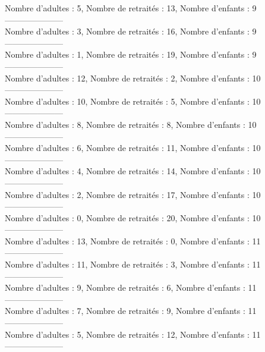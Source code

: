 \documentclass[10pt,a4paper]{article}
\begin{document}
Nombre d'adultes : 5, Nombre de retraités : 13, Nombre d'enfants : 9\\
---------------------\\
Nombre d'adultes : 3, Nombre de retraités : 16, Nombre d'enfants : 9\\
---------------------\\
Nombre d'adultes : 1, Nombre de retraités : 19, Nombre d'enfants : 9\\
---------------------\\
Nombre d'adultes : 12, Nombre de retraités : 2, Nombre d'enfants : 10\\
---------------------\\
Nombre d'adultes : 10, Nombre de retraités : 5, Nombre d'enfants : 10\\
---------------------\\
Nombre d'adultes : 8, Nombre de retraités : 8, Nombre d'enfants : 10\\
---------------------\\
Nombre d'adultes : 6, Nombre de retraités : 11, Nombre d'enfants : 10\\
---------------------\\
Nombre d'adultes : 4, Nombre de retraités : 14, Nombre d'enfants : 10\\
---------------------\\
Nombre d'adultes : 2, Nombre de retraités : 17, Nombre d'enfants : 10\\
---------------------\\
Nombre d'adultes : 0, Nombre de retraités : 20, Nombre d'enfants : 10\\
---------------------\\
Nombre d'adultes : 13, Nombre de retraités : 0, Nombre d'enfants : 11\\
---------------------\\
Nombre d'adultes : 11, Nombre de retraités : 3, Nombre d'enfants : 11\\
---------------------\\
Nombre d'adultes : 9, Nombre de retraités : 6, Nombre d'enfants : 11\\
---------------------\\
Nombre d'adultes : 7, Nombre de retraités : 9, Nombre d'enfants : 11\\
---------------------\\
Nombre d'adultes : 5, Nombre de retraités : 12, Nombre d'enfants : 11\\
---------------------\\
\end{document}
